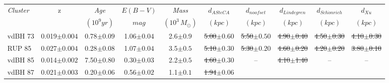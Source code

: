 \documentclass[draft]{aa}
\providecommand{\DIFaddtex}[1]{{\protect\color{blue}\uwave{#1}}} %
\providecommand{\DIFdeltex}[1]{{\protect\color{red}\sout{#1}}}                      %
\providecommand{\DIFaddFL}[1]{\DIFadd{#1}} %
\providecommand{\DIFdelFL}[1]{\DIFdel{#1}} %
\providecommand{\DIFaddbeginFL}{} %
\providecommand{\DIFaddendFL}{} %
\providecommand{\DIFdelbeginFL}{} %
\providecommand{\DIFdelendFL}{} %
\providecommand{\DIFadd}[1]{\texorpdfstring{\DIFaddtex{#1}}{#1}} %
\providecommand{\DIFdel}[1]{\texorpdfstring{\DIFdeltex{#1}}{}} %
\newcommand{\DIFscaledelfig}{0.5}
\newlength{\DIFdelgraphicswidth} %
\newlength{\DIFdelgraphicsheight} %
\newcommand{\DIFaddincludegraphics}[2][]{{\color{blue}\fbox{\DIFOincludegraphics[#1]{#2}}}} %
\newcommand{\DIFdelincludegraphics}[2][]{%
\sbox{\DIFdelgraphicsbox}{\DIFOincludegraphics[#1]{#2}}%
\settoboxwidth{\DIFdelgraphicswidth}{\DIFdelgraphicsbox} %
\settoboxtotalheight{\DIFdelgraphicsheight}{\DIFdelgraphicsbox} %
\scalebox{\DIFscaledelfig}{%
\parbox[b]{\DIFdelgraphicswidth}{\usebox{\DIFdelgraphicsbox}\\[-\baselineskip] \rule{\DIFdelgraphicswidth}{0em}}\llap{\resizebox{\DIFdelgraphicswidth}{\DIFdelgraphicsheight}{%
\setlength{\unitlength}{\DIFdelgraphicswidth}%
\begin{picture}(1,1)%
\thicklines\linethickness{2pt} %
{\color[rgb]{1,0,0}\put(0,0){\framebox(1,1){}}}%
{\color[rgb]{1,0,0}\put(0,0){\line( 1,1){1}}}%
{\color[rgb]{1,0,0}\put(0,1){\line(1,-1){1}}}%
\end{picture}%
}\hspace*{3pt}}} %
} %
\DeclareRobustCommand{\DIFaddbeginFL}{\DIFOaddbeginFL \let\includegraphics\DIFaddincludegraphics} %
\DeclareRobustCommand{\DIFaddendFL}{\DIFOaddendFL \let\includegraphics\DIFOincludegraphics} %
\DeclareRobustCommand{\DIFdelbeginFL}{\DIFOdelbeginFL \let\includegraphics\DIFdelincludegraphics} %
\DeclareRobustCommand{\DIFdelendFL}{\DIFOaddendFL \let\includegraphics\DIFOincludegraphics} %
\begin{document}
\begin{table}[ht]
\small
\centering
\begin{tabular}{lccccccccc}
\hline
 \emph{Cluster} & z & \emph{Age} & $E(B-V)$ & \emph{Mass} &
 $d_{ASteCA}$ & $d_{noofset}$ & $d_{Lindegren}$ & $d_{Sch\ddot{o}nrich}$ &
 $d_{Xu}$ \\
& & $(10^9 yr)$ & $mag$ & $(10^3\,M_{\odot})$ & $(kpc)$ & $(kpc)$ & $(kpc)$ &
$(kpc)$ & $(kpc)$\\
 \hline\hline
 vdBH 73 & 0.019$\pm0.004$ & 0.78$\pm0.09$ & 1.06$\pm0.04$ & 2.6$\pm0.9$ &
 \DIFdelbeginFL \DIFdelFL{5.00$\pm0.60$ }\DIFdelendFL %
 \DIFaddbeginFL \DIFaddFL{$5.01\pm0.61$ }\DIFaddendFL & \DIFdelbeginFL \DIFdelFL{5.50$\pm0.50$ }\DIFdelendFL \DIFaddbeginFL \DIFaddFL{$5.48\pm0.44$ }\DIFaddendFL & \DIFdelbeginFL \DIFdelFL{4.90$\pm$0.40 }\DIFdelendFL \DIFaddbeginFL \DIFaddFL{$4.92\pm0.41$ }\DIFaddendFL & \DIFdelbeginFL \DIFdelFL{4.50$\pm$0.30 }\DIFdelendFL \DIFaddbeginFL \DIFaddFL{$4.46\pm0.31$ }\DIFaddendFL & \DIFdelbeginFL \DIFdelFL{4.10$\pm$0.30}\DIFdelendFL \DIFaddbeginFL \DIFaddFL{$4.05\pm0.33$}\DIFaddendFL \\
 RUP 85 & 0.027$\pm0.004$ & 0.28$\pm0.08$ & 1.07$\pm0.04$ & 3.5$\pm0.5$ &
 \DIFdelbeginFL \DIFdelFL{5.10$\pm0.30$ }\DIFdelendFL %
 \DIFaddbeginFL \DIFaddFL{$5.14\pm0.33$ }\DIFaddendFL & \DIFdelbeginFL \DIFdelFL{5.30$\pm0.20$ }\DIFdelendFL \DIFaddbeginFL \DIFaddFL{$5.30\pm0.24$ }\DIFaddendFL & \DIFdelbeginFL \DIFdelFL{4.60$\pm$0.20 }\DIFdelendFL \DIFaddbeginFL \DIFaddFL{$4.64\pm0.19$ }\DIFaddendFL & \DIFdelbeginFL \DIFdelFL{4.20$\pm$0.20 }\DIFdelendFL \DIFaddbeginFL \DIFaddFL{$4.16\pm0.15$ }\DIFaddendFL & \DIFdelbeginFL \DIFdelFL{3.80$\pm$0.10}\DIFdelendFL \DIFaddbeginFL \DIFaddFL{$3.83\pm0.14$}\DIFaddendFL \\
 vdBH 85 & 0.014$\pm0.002$ & 7.50$\pm0.80$ & 0.30$\pm0.03$ & 2.2$\pm0.5$ &
 \DIFdelbeginFL \DIFdelFL{4.60$\pm0.30$ }\DIFdelendFL %
 \DIFaddbeginFL \DIFaddFL{$4.61\pm0.26$ }\DIFaddendFL & -- & \DIFdelbeginFL \DIFdelFL{4.10$\pm$1.40 }\DIFdelendFL \DIFaddbeginFL \DIFaddFL{$4.15\pm1.38$ }\DIFaddendFL & -- & --\\
 vdBH 87 & 0.021$\pm0.003$ & 0.20$\pm0.06$ & 0.56$\pm0.02$ & 1.1$\pm0.1$ &
 \DIFdelbeginFL \DIFdelFL{1.94$\pm0.06$ }\DIFdelendFL %

\end{tabular}
\end{table}
\end{document}
